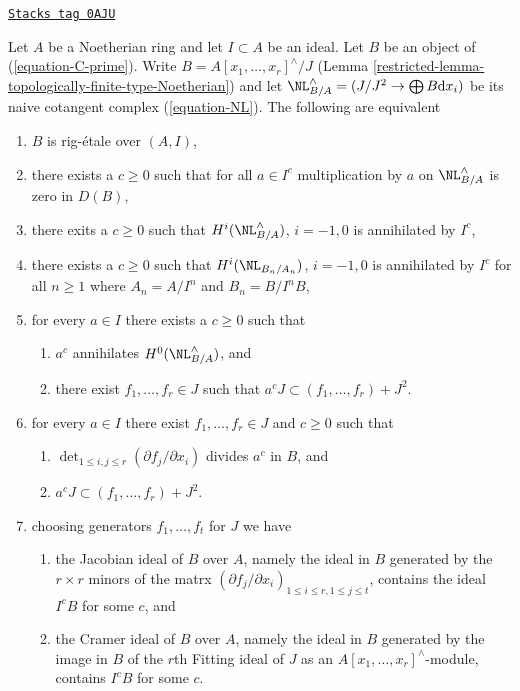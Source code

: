 \begin{lemma}
\label{restricted-lemma-equivalent-with-artin}
\href{https://stacks.math.columbia.edu/tag/0AJU}{\texttt{Stacks tag 0AJU}}

Let $A$ be a Noetherian ring and let $I \subset A$ be an ideal.
Let $B$ be an object of (\ref{equation-C-prime}). Write
$B = A[x_1, \ldots, x_r]^\wedge/J$
(Lemma \ref{restricted-lemma-topologically-finite-type-Noetherian})
and let $\NL_{B/A}^\wedge = (J/J^2 \to \bigoplus B\text{d}x_i)$
be its naive cotangent complex (\ref{equation-NL}).
The following are equivalent
\begin{enumerate}
\item $B$ is rig-\'etale over $(A, I)$,
\item
\label{restricted-item-zero-on-NL}
there exists a $c \geq 0$ such that for all $a \in I^c$ multiplication by $a$
on $\NL_{B/A}^\wedge$ is zero in $D(B)$,
\item
\label{restricted-item-zero-on-cohomology-NL}
there exits a $c \geq 0$ such that $H^i(\NL_{B/A}^\wedge)$, $i = -1, 0$ is
annihilated by $I^c$,
\item
\label{restricted-item-zero-on-cohomology-NL-truncations}
there exists a $c \geq 0$ such that $H^i(\NL_{B_n/A_n})$, $i = -1, 0$ is
annihilated by $I^c$ for all $n \geq 1$ where $A_n = A/I^n$ and $B_n = B/I^nB$,
\item
\label{restricted-item-condition-artin-pre-pre}
for every $a \in I$ there exists a $c \geq 0$ such that
\begin{enumerate}
\item $a^c$ annihilates $H^0(\NL_{B/A}^\wedge)$, and
\item there exist $f_1, \ldots, f_r \in J$ such that
$a^c J \subset (f_1, \ldots, f_r) + J^2$.
\end{enumerate}
\item
\label{restricted-item-condition-artin-pre}
for every $a \in I$ there exist $f_1, \ldots, f_r \in J$ and $c \geq 0$
such that
\begin{enumerate}
\item $\det_{1 \leq i, j \leq r}(\partial f_j/\partial x_i)$ divides
$a^c$ in $B$, and
\item $a^c J \subset (f_1, \ldots, f_r) + J^2$.
\end{enumerate}
\item
\label{restricted-item-condition-artin}
choosing generators $f_1, \ldots, f_t$ for $J$ we have
\begin{enumerate}
\item the Jacobian ideal of $B$ over $A$, namely the ideal in $B$
generated by the $r \times r$ minors of the matrx
$(\partial f_j/\partial x_i)_{1 \leq i \leq r, 1 \leq j \leq t}$,
contains the ideal $I^cB$ for some $c$, and
\item the Cramer ideal of $B$ over $A$, namely the ideal in $B$
generated by the image in $B$ of the $r$th Fitting ideal of $J$
as an $A[x_1, \ldots, x_r]^\wedge$-module, contains $I^cB$ for some $c$.
\end{enumerate}
\end{enumerate}
\end{lemma}

